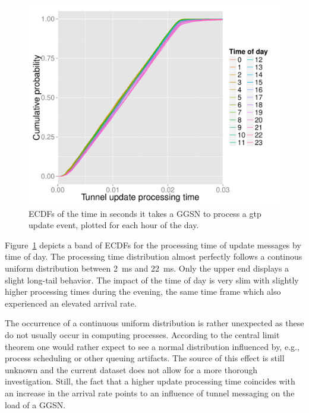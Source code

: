 \begin{figure}[htb]
	\centering
	\includegraphics[width=1.0\textwidth]{images/R-update-time-cdfs.pdf}
	\caption{\glspl{ECDF} of the time in seconds it takes a \gls{GGSN} to process a \gls{gtp} update event, plotted for each hour of the day.}
	\label{c4:fig:update-time}
\end{figure}


Figure~\ref{c4:fig:update-time} depicts a band of \glspl{ECDF} for the processing time of update messages by time of day. The processing time distribution almost perfectly follows a continous uniform distribution between \SI{2}{\milli\second} and \SI{22}{\milli\second}. Only the upper end displays a slight long-tail behavior. The impact of the time of day is very slim with slightly higher processing times during the evening, the same time frame which also experienced an elevated arrival rate.

The occurrence of a continuous uniform distribution is rather unexpected as these do not usually occur in computing processes. According to the central limit theorem one would rather expect to see a normal distribution influenced by, e.g., process scheduling or other queuing artifacts. The source of this effect is still unknown and the current dataset does not allow for a more thorough investigation.
Still, the fact that a higher update processing time coincides with an increase in the arrival rate points to an influence of tunnel messaging on the load of a \gls{GGSN}.



